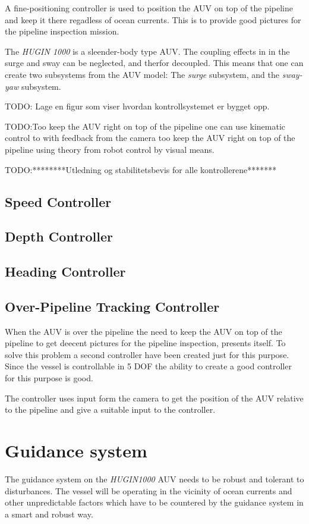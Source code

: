 	A fine-positioning controller is used to position the AUV on top of the pipeline and keep it there regadless of ocean currents. This is to provide good pictures for the pipeline inspection mission.
	
	The \textit{HUGIN 1000} is a sleender-body type AUV. The coupling effects in in the surge and sway can be neglected, and therfor decoupled. This means that one can create two subsystems from the AUV model: The \textit{surge} subsystem, and the \textit{sway-yaw} subsystem. 
	
	TODO: Lage en figur som viser hvordan kontrollsystemet er bygget opp.
	
	TODO:Too keep the AUV right on top of the pipeline one can use kinematic control to with feedback from the camera too keep the AUV right on top of the pipeline using theory from robot control by visual means.
	
	
	TODO:********Utledning og stabilitetsbevis for alle kontrollerene*******
	\subsection{Speed Controller}
	
	
	
	\subsection{Depth Controller}

	
	
	\subsection{Heading Controller}
	
	
	\subsection{Over-Pipeline Tracking Controller}
		When the AUV is over the pipeline the need to keep the AUV on top of the pipeline to get deecent pictures for the pipeline inspection, presents itself. To solve this problem a second controller have been created just for this purpose. Since the vessel is controllable in 5 DOF the ability to create a good controller for this purpose is good. 
		
		The controller uses input form the camera to get the position of the AUV relative to the pipeline and give a suitable input to the controller.
		
\section{Guidance system}
	The guidance system on the \textit{HUGIN1000} AUV needs to be robust and tolerant to disturbances. The vessel will be operating in the vicinity of ocean currents and other unpredictable factors which have to be countered by the guidance system in a smart and robust way.
	

